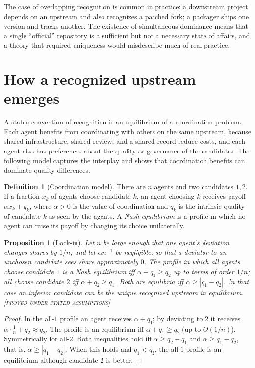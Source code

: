 \documentclass[11pt,twoside,openright]{book}
\theoremstyle{plain}
\newtheorem{proposition}[theorem]{Proposition}
\theoremstyle{definition}
\newtheorem{definition}[theorem]{Definition}
\theoremstyle{remark}
\newcommand{\Proved}{\textup{\textsc{[proved under stated assumptions]}}}
\begin{document}
The case of overlapping recognition is common in practice: a downstream project depends on an upstream and also recognizes a patched fork; a packager ships one version and tracks another. The existence of simultaneous dominance means that a single ``official'' repository is a sufficient but not a necessary state of affairs, and a theory that required uniqueness would misdescribe much of real practice.

\section{How a recognized upstream emerges}

A stable convention of recognition is an equilibrium of a coordination problem. Each agent benefits from coordinating with others on the same upstream, because shared infrastructure, shared review, and a shared record reduce costs, and each agent also has preferences about the quality or governance of the candidates. The following model captures the interplay and shows that coordination benefits can dominate quality differences.

\begin{definition}[Coordination model]\label{def:coordmodel}
There are $n$ agents and two candidates $1,2$. If a fraction $x_k$ of agents choose candidate $k$, an agent choosing $k$ receives payoff $\alpha x_k+q_k$, where $\alpha>0$ is the value of coordination and $q_k$ is the intrinsic quality of candidate $k$ as seen by the agents. A \emph{Nash equilibrium} is a profile in which no agent can raise its payoff by changing its choice unilaterally.
\end{definition}

\begin{proposition}[Lock-in]\label{prop:lockin}
Let $n$ be large enough that one agent's deviation changes shares by $1/n$, and let $\alpha n^{-1}$ be negligible, so that a deviator to an unchosen candidate sees share approximately $0$. The profile in which all agents choose candidate $1$ is a Nash equilibrium iff $\alpha+q_1\ge q_2$ up to terms of order $1/n$; all choose candidate $2$ iff $\alpha+q_2\ge q_1$. Both are equilibria iff $\alpha\ge|q_1-q_2|$. In that case an inferior candidate can be the unique recognized upstream in equilibrium.
\Proved{}
\end{proposition}

\begin{proof}
In the all-$1$ profile an agent receives $\alpha+q_1$; by deviating to $2$ it receives $\alpha\cdot\frac1n+q_2\approx q_2$. The profile is an equilibrium iff $\alpha+q_1\ge q_2$ (up to $O(1/n)$). Symmetrically for all-$2$. Both inequalities hold iff $\alpha\ge q_2-q_1$ and $\alpha\ge q_1-q_2$, that is, $\alpha\ge|q_1-q_2|$. When this holds and $q_1<q_2$, the all-$1$ profile is an equilibrium although candidate $2$ is better.
\end{proof}
\end{document}
